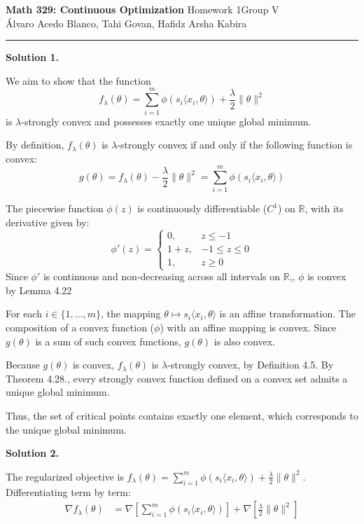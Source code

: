 \documentclass[12pt]{article}
\newcommand{\groupv}{V}
\newcommand{\homework}{1}
\newcommand{\solution}[1]{\vspace{1em}\noindent \textbf{Solution #1.}\par}
\begin{document}
\noindent
\textbf{Math 329: Continuous Optimization} \quad Homework \homework \quad Group \groupv \\
Álvaro Acedo Blanco, Tahi Govan, Hafidz Arsha Kabira

\vspace{1em}
\hrule
\vspace{1em}

\solution{1}

We aim to show that the function
\[
f_\lambda(\theta) = \sum_{i=1}^m \phi(s_i \langle x_i, \theta\rangle) + \frac{\lambda}{2}\|\theta\|^2
\]
is $\lambda$-strongly convex and possesses exactly one unique global minimum.

By definition, $f_\lambda(\theta)$ is $\lambda$-strongly convex if and only if the following function is convex:
\[
g(\theta) = f_\lambda(\theta) - \frac{\lambda}{2}\|\theta\|^2 = \sum_{i=1}^m \phi(s_i \langle x_i, \theta\rangle)
\]

The piecewise function $\phi(z)$ is continuously differentiable ($C^1$) on $\mathbb{R}$, with its derivative given by:
\[
\phi'(z) = 
\begin{cases} 
0, & z \leq -1 \\ 
1 + z, & -1 \leq z \leq 0 \\ 
1, & z \geq 0 
\end{cases}
\]
Since $\phi'$ is continuous and non-decreasing across all intervals on $\mathbb{R}$,, $\phi$ is convex by Lemma 4.22

For each $i \in \{1, \dots, m\}$, the mapping $\theta \mapsto s_i \langle x_i, \theta \rangle$ is an affine transformation. The composition of a convex function ($\phi$) with an affine mapping is convex. Since $g(\theta)$ is a sum of such convex functions, $g(\theta)$ is also convex.

Because $g(\theta)$ is convex, $f_\lambda(\theta)$ is $\lambda$-strongly convex, by Definition 4.5. By Theorem 4.28., every strongly convex function defined on a convex set admits a unique global minimum.

Thus, the set of critical points contains exactly one element, which corresponds to the unique global minimum.

\solution{2}

The regularized objective is $f_\lambda(\theta) = \sum_{i=1}^m \phi(s_i \langle x_i, \theta\rangle) + \frac{\lambda}{2}\|\theta\|^2$. Differentiating term by term:
\begin{align*}
\nabla f_\lambda(\theta) &= \nabla\left[\sum_{i=1}^m \phi(s_i \langle x_i, \theta\rangle)\right] + \nabla\left[\frac{\lambda}{2}\|\theta\|^2\right]
\end{align*}
\end{document}

